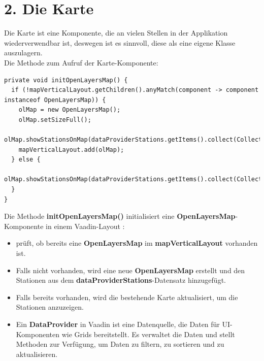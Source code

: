 \documentclass[a4paper,12pt]{scrreprt}
\begin{document}
\section*{\small \textbf{2. Die Karte}}
Die Karte ist eine Komponente, die an vielen Stellen in der Applikation wiederverwendbar ist, deswegen ist es sinnvoll, diese als eine eigene Klasse auszulagern.\\
Die Methode zum Aufruf der Karte-Komponente:
\begin{lstlisting}
private void initOpenLayersMap() {
  if (!mapVerticalLayout.getChildren().anyMatch(component -> component instanceof OpenLayersMap)) {
	olMap = new OpenLayersMap();
	olMap.setSizeFull();
	olMap.showStationsOnMap(dataProviderStations.getItems().collect(Collectors.toList()));
    mapVerticalLayout.add(olMap);
  } else {
	olMap.showStationsOnMap(dataProviderStations.getItems().collect(Collectors.toList()));
  }
}
\end{lstlisting}
Die Methode \textbf{initOpenLayersMap()} initialisiert eine \textbf{OpenLayersMap}-Komponente in einem Vaadin-Layout :
\begin{itemize}
\item prüft, ob bereits eine \textbf{OpenLayersMap} im \textbf{mapVerticalLayout} vorhanden ist.
\item Falls nicht vorhanden, wird eine neue  \textbf{OpenLayersMap} erstellt und den Stationen aus dem  \textbf{dataProviderStations}-Datensatz hinzugefügt.
\item Falls bereits vorhanden, wird die bestehende Karte aktualisiert, um die Stationen anzuzeigen.
\item Ein \textbf{DataProvider} in Vaadin ist eine Datenquelle, die Daten für UI-Komponenten wie Grids bereitstellt. Es verwaltet die Daten und stellt Methoden zur Verfügung, um Daten zu filtern, zu sortieren und zu aktualisieren.
\end{itemize}
\end{document}
